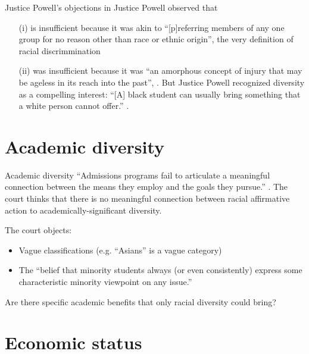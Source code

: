 \documentclass[ignorenonframetext, aspectratio=169]{beamer}
\newcommand{\nopage}{\_\_\_\_}
\begin{document}
\begin{frame}{Justice Powell's objections in }
Justice Powell observed that
\begin{enumerate}
	\item[(i)] is insufficient because it was akin to ``[p]referring members of any one group for no reason other than race or ethnic origin'', the very definition of racial discrimmination
	\item[(ii)] was insufficient because it was ``an amorphous concept of injury that may be ageless in its reach into the past'', . But Justice Powell recognized diversity as a compelling interest: ``[A] black student can usually bring something that a white person cannot offer.'' .
\end{enumerate}
\end{frame}

\section{Academic diversity}

\begin{frame}{Academic diversity}
``Admissions programs fail to articulate a meaningful connection between the means they employ and the goals they pursue.'' \Runcite[\nopage{} (slip op.\ 24)]{harvard}. The court thinks that there is no meaningful connection between racial affirmative action to academically-significant diversity.

The court objects:
\begin{itemize}
	\item Vague classifications (e.g. ``Asians'' is a vague category)
	\item The ``belief that minority students always (or even consistently) express some characteristic minority viewpoint on any issue.''
\end{itemize}
Are there specific academic benefits that only racial diversity could bring?
\end{frame}

\section{Economic status}
\end{document}
